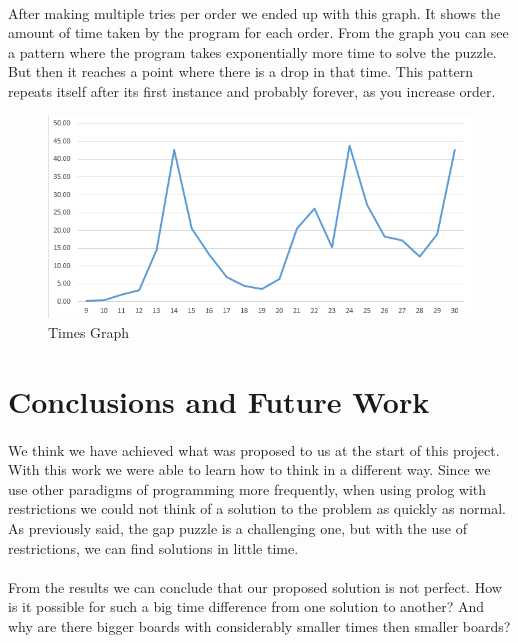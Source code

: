 \documentclass[runningheads]{llncs}
\begin{document}
\paragraph{}
After making multiple tries per order we ended up with this graph. It shows the amount of time taken by the program for
each order. From the graph you can see a pattern where the program takes exponentially more time to solve the puzzle. But then it
reaches a point where there is a drop in that time. This pattern repeats itself after its first instance and probably forever, as you increase order.

\begin{figure}
    \begin{center}
        \includegraphics[scale=0.6]{images/graph.png}
        \caption{Times Graph} \label{fig5}
    \end{center}
\end{figure}

\section{Conclusions and Future Work}
\paragraph{}
We think we have achieved what was proposed to us at the start of this project. With this work we were able to learn how to think in a different way.
Since we use other paradigms of programming more frequently, when using prolog with restrictions we could not think of a solution to the problem as quickly as normal.
As previously said, the gap puzzle is a challenging one, but with the use of restrictions, we can find solutions in little time.
\paragraph{}
From the results we can conclude that our proposed solution is not perfect. How is it possible for such a big time difference from one solution to another?
And why are there bigger boards with considerably smaller times then smaller boards?
\end{document}
